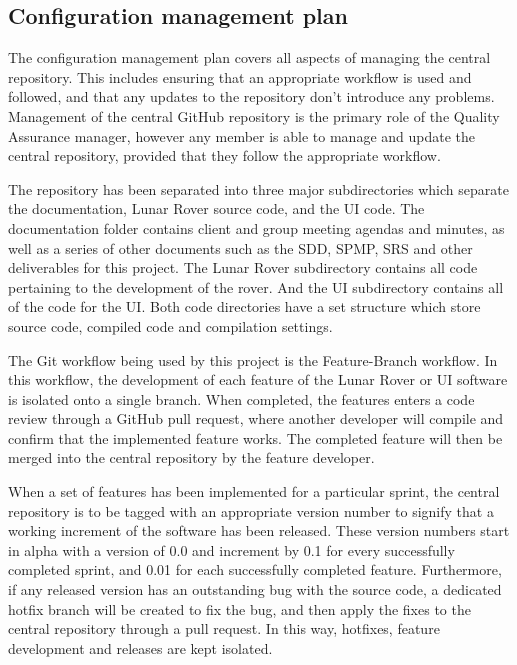 \documentclass{article}
\begin{document}
\subsection{Configuration management plan}
\begin{adjustwidth}{1em}{0pt}
The configuration management plan covers all aspects of managing the central repository. This includes ensuring that an appropriate workflow is used and followed, and that any updates to the repository don't introduce any problems. Management of the central GitHub repository is the primary role of the Quality Assurance manager, however any member is able to manage and update the central repository, provided that they follow the appropriate workflow.

The repository has been separated into three major subdirectories which separate the documentation, Lunar Rover source code, and the UI code. The documentation folder contains client and group meeting agendas and minutes, as well as a series of other documents such as the SDD, SPMP, SRS and other deliverables for this project. The Lunar Rover subdirectory contains all code pertaining to the development of the rover. And the UI subdirectory contains all of the code for the UI. Both code directories have a set structure which store source code, compiled code and compilation settings.

The Git workflow being used by this project is the Feature-Branch workflow. In this workflow, the development of each feature of the Lunar Rover or UI software is isolated onto a single branch. When completed, the features enters a code review through a GitHub pull request, where another developer will compile and confirm that the implemented feature works. The completed feature will then be merged into the central repository by the feature developer.

When a set of features has been implemented for a particular sprint, the central repository is to be tagged with an appropriate version number to signify that a working increment of the software has been released. These version numbers start in alpha with a version of 0.0 and increment by 0.1 for every successfully completed sprint, and 0.01 for each successfully completed feature. Furthermore, if any released version has an outstanding bug with the source code, a dedicated hotfix branch will be created to fix the bug, and then apply the fixes to the central repository through a pull request. In this way, hotfixes, feature development and releases are kept isolated.
\end{adjustwidth}
\end{document}

